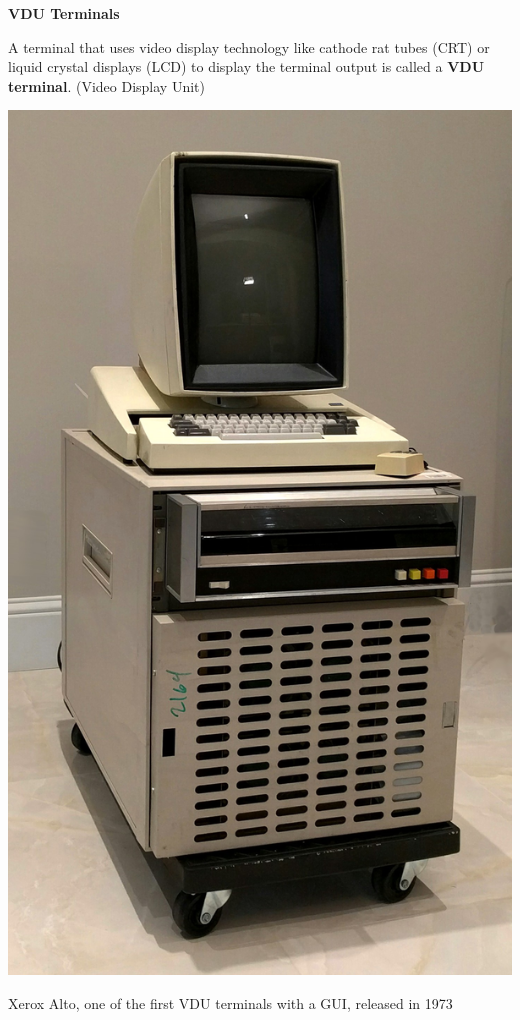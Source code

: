 \textbf{VDU Terminals}

\begin{definition}
  A terminal that uses video display technology like
  cathode rat tubes (CRT) or liquid crystal displays (LCD)
  to display the terminal output is called a \textbf{VDU terminal}.
  (Video Display Unit)
\end{definition}

\begin{marginfigure}
  \includegraphics{images/png/alto.png}
  \caption{Xerox Alto, one of the first VDU terminals with a GUI, released in 1973}
\end{marginfigure}

